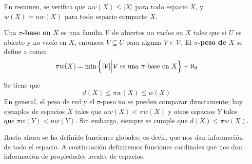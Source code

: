 \documentclass[12pt]{report}
\theoremstyle{largebreak}
\newcommand\abs[1]{\ensuremath{\lvert#1\rvert}}
\begin{document}
    \begin{obs}
        En resumen, se verifica que $nw(X)\leq\abs{X}$ para todo espacio $X$, y $w(X)=nw(X)$ para todo espacio compacto $X$.
    \end{obs}

    \begin{mydef}
        Una \textbf{$\pi$-base en $X$} es una familia $\mathcal{V}$ de abiertos no vacíos en $X$ tales que si $U$ es abierto y no vacío en $X$, entonces $V\subseteq U$ para alguna $V\in\mathcal{V}$. El \textbf{$\pi$-peso de $X$} se define a como:
        \begin{equation*}
            \pi w(X)=\min\left\{\abs{\mathcal{V}}\Big|\mathcal{V}\textup{ es una $\pi$-base en }X \right\}+\aleph_0
        \end{equation*}
    \end{mydef}
    
    \begin{obs}
        Se tiene que
        \begin{equation*}
            d(X)\leq \pi w(X)\leq w(X)
        \end{equation*}
        En general, el peso de red y el $\pi$-peso no se pueden comparar directamente; hay ejemplos de espacios $X$ tales que $nw(X)<\pi w(X)$ y otros espacios $Y$ tales que $\pi w(Y)<nw(Y)$. Sin embargo, siempre se cumple que $d(X)\leq \pi w(X)$.
    \end{obs}

    Hasta ahora se ha definido funciones globales, es decir, que nos dan información de todo el espacio. A continuación definiremos funciones cardinales que nos dan información de propiedades locales de espacios.
\end{document}
